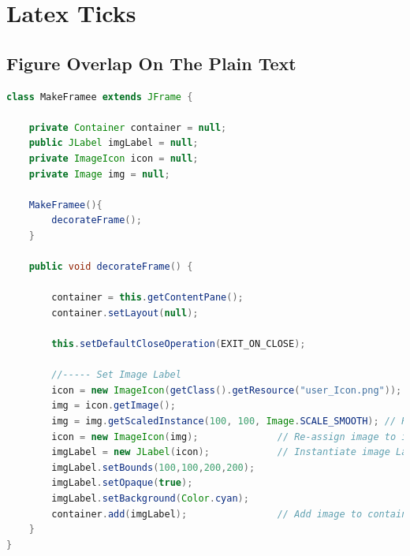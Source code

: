\chapter{Latex Ticks}

\section{Figure Overlap On The Plain Text}

\begin{frame}

\begin{lstlisting}[language=java]
class MakeFramee extends JFrame {
	
	private Container container = null;
	public JLabel imgLabel = null;
	private ImageIcon icon = null;
	private Image img = null;

	MakeFramee(){
		decorateFrame();
	}
	
	public void decorateFrame() {
		
		container = this.getContentPane();
		container.setLayout(null);
		
		this.setDefaultCloseOperation(EXIT_ON_CLOSE);

		//----- Set Image Label
		icon = new ImageIcon(getClass().getResource("user_Icon.png"));
		img = icon.getImage();
		img = img.getScaledInstance(100, 100, Image.SCALE_SMOOTH); // Resize Image
		icon = new ImageIcon(img);				// Re-assign image to icon
		imgLabel = new JLabel(icon);			// Instantiate image Label
		imgLabel.setBounds(100,100,200,200);
		imgLabel.setOpaque(true);
		imgLabel.setBackground(Color.cyan);
		container.add(imgLabel);				// Add image to container
	}
}

\end{lstlisting}


\end{frame}



